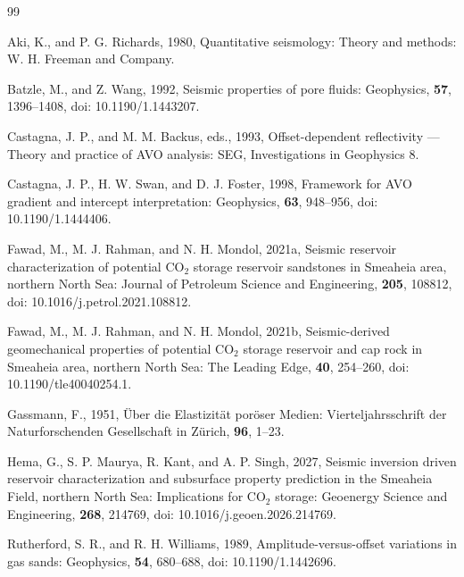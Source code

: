 \documentclass[11pt]{article}
\begin{document}
\begin{thebibliography}{99}
\setlength{\itemsep}{0pt}

Aki, K., and P. G. Richards, 1980, Quantitative seismology: Theory and methods: W. H. Freeman and Company.

Batzle, M., and Z. Wang, 1992, Seismic properties of pore fluids: Geophysics, \textbf{57}, 1396--1408, doi: 10.1190/1.1443207.

Castagna, J. P., and M. M. Backus, eds., 1993, Offset-dependent reflectivity --- Theory and practice of AVO analysis: SEG, Investigations in Geophysics 8.

Castagna, J. P., H. W. Swan, and D. J. Foster, 1998, Framework for AVO gradient and intercept interpretation: Geophysics, \textbf{63}, 948--956, doi: 10.1190/1.1444406.

Fawad, M., M. J. Rahman, and N. H. Mondol, 2021a, Seismic reservoir characterization of potential CO$_2$ storage reservoir sandstones in Smeaheia area, northern North Sea: Journal of Petroleum Science and Engineering, \textbf{205}, 108812, doi: 10.1016/j.petrol.2021.108812.

Fawad, M., M. J. Rahman, and N. H. Mondol, 2021b, Seismic-derived geomechanical properties of potential CO$_2$ storage reservoir and cap rock in Smeaheia area, northern North Sea: The Leading Edge, \textbf{40}, 254--260, doi: 10.1190/tle40040254.1.

Gassmann, F., 1951, \"Uber die Elastizit\"at por\"oser Medien: Vierteljahrsschrift der Naturforschenden Gesellschaft in Z\"urich, \textbf{96}, 1--23.

Hema, G., S. P. Maurya, R. Kant, and A. P. Singh, 2027, Seismic inversion driven reservoir characterization and subsurface property prediction in the Smeaheia Field, northern North Sea: Implications for CO$_2$ storage: Geoenergy Science and Engineering, \textbf{268}, 214769, doi: 10.1016/j.geoen.2026.214769.

Rutherford, S. R., and R. H. Williams, 1989, Amplitude-versus-offset variations in gas sands: Geophysics, \textbf{54}, 680--688, doi: 10.1190/1.1442696.


\end{thebibliography}
\end{document}
